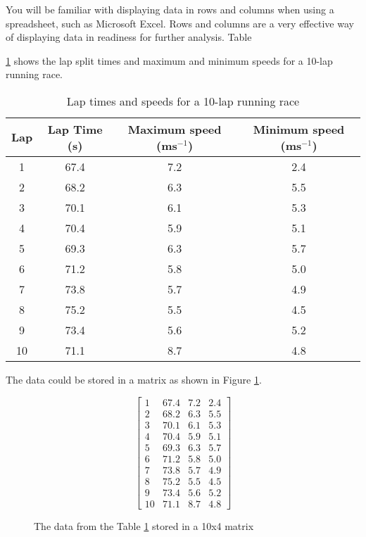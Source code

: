 \documentclass[12pt,a4paper]{article}
\begin{document}
You will be familiar with displaying data in rows and columns when using a spreadsheet, such as Microsoft Excel.  
Rows and columns are a very effective way of displaying data in readiness for further analysis.  
Table {\ref{tab:laptimes} shows the lap split times and maximum and minimum speeds for a 10-lap running race.  

\begin{table}[H]
  \begin{center}
    \begin{tabular}{cccc}
    \toprule
    Lap & Lap Time (s) & Maximum speed (ms$^{-1}$) & Minimum speed (ms$^{-1}$) \\
    \midrule
    1 & 67.4 & 7.2 & 2.4 \\
    2 & 68.2 & 6.3 & 5.5 \\
    3 & 70.1 & 6.1 & 5.3 \\
    4 & 70.4 & 5.9 & 5.1 \\
    5 & 69.3 & 6.3 & 5.7 \\
    6 & 71.2 & 5.8 & 5.0 \\
    7 & 73.8 & 5.7 & 4.9 \\
    8 & 75.2 & 5.5 & 4.5 \\
    9 & 73.4 & 5.6 & 5.2 \\
    10 & 71.1 & 8.7 & 4.8 \\
    \bottomrule    
    \end{tabular}
  \end{center}
  \caption{Lap times and speeds for a 10-lap running race \label{tab:laptimes}}  
\end{table}

The data could be stored in a matrix as shown in Figure \ref{fig:lapmatrix}.

\begin{figure}[H]
	\[ \left[ \begin{array}{cccc}
	1 & 67.4 & 7.2 & 2.4 \\
    2 & 68.2 & 6.3 & 5.5 \\
    3 & 70.1 & 6.1 & 5.3 \\
    4 & 70.4 & 5.9 & 5.1 \\
    5 & 69.3 & 6.3 & 5.7 \\
    6 & 71.2 & 5.8 & 5.0 \\
    7 & 73.8 & 5.7 & 4.9 \\
    8 & 75.2 & 5.5 & 4.5 \\
    9 & 73.4 & 5.6 & 5.2 \\
    10 & 71.1 & 8.7 & 4.8 \end{array} \right]\]	
	\caption{The data from the Table \protect \ref{tab:laptimes} stored in a 10x4 matrix \label{fig:lapmatrix}}	
\end{figure}

}
\end{document}
